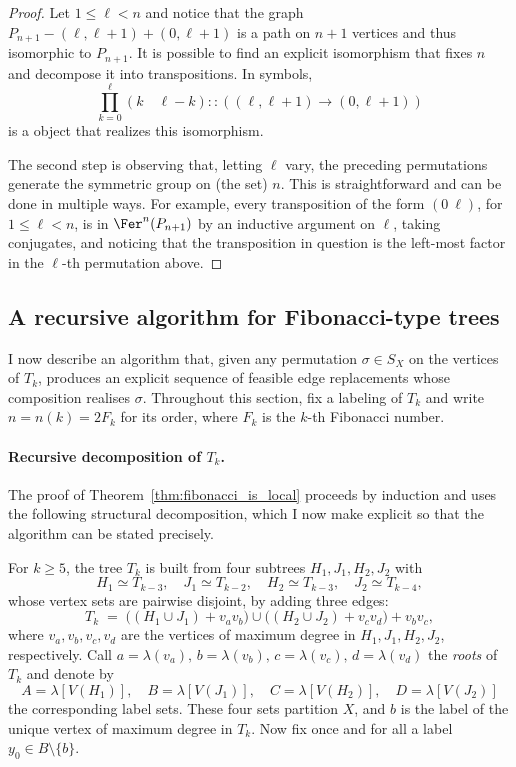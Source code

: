 \begin{proof}
    Let $1\leq\ell<n$ and notice that the graph $P_{n+1}-(\ell,\ell+1)+(0,\ell+1)$ is a path on $n+1$ vertices and thus isomorphic to $P_{n+1}$.
    It is possible to find an explicit isomorphism that fixes $n$ and decompose it into transpositions.
    In symbols, $$\prod_{k=0}^\ell(k\quad\ell-k)::((\ell,\ell+1)\to(0,\ell+1))$$ is a \tfer object that realizes this isomorphism.
    
    The second step is observing that, letting $\ell$ vary, the preceding permutations generate the symmetric group on (the set) $n$.
    This is straightforward and can be done in multiple ways.
    For example, every transposition of the form $(0\ \ell)$, for $1\leq\ell<n$, is in $\Fer^n(P_{n+1})$ by an inductive argument on $\ell$, taking conjugates, and noticing that the transposition in question is the left-most factor in the $\ell$-th permutation above.
\end{proof}

\subsection{A recursive algorithm for Fibonacci-type trees}\label{subsec:algorithm_Tk}

I now describe an algorithm that, given any permutation $\sigma\in S_X$ on the vertices of $T_k$, produces an explicit sequence of feasible edge replacements whose composition realises $\sigma$.
Throughout this section, fix a labeling of $T_k$ and write $n = n(k) = 2F_k$ for its order, where $F_k$ is the $k$-th Fibonacci number.

\paragraph{Recursive decomposition of $T_k$.}
The proof of Theorem~\ref{thm:fibonacci_is_local} proceeds by induction and uses the following structural decomposition, which I now make explicit so that the algorithm can be stated precisely.

For $k \ge 5$, the tree $T_k$ is built from four subtrees $H_1, J_1, H_2, J_2$ with
$$
    H_1 \simeq T_{k-3},\quad
    J_1 \simeq T_{k-2},\quad
    H_2 \simeq T_{k-3},\quad
    J_2 \simeq T_{k-4},
$$
whose vertex sets are pairwise disjoint, by adding three edges:
$$
    T_k
    \;=\;
    \bigl((H_1 \cup J_1) + v_a v_b\bigr)
    \cup
    \bigl((H_2 \cup J_2) + v_c v_d\bigr)
    + v_b v_c,
$$
where $v_a, v_b, v_c, v_d$ are the vertices of maximum degree in $H_1, J_1, H_2, J_2$, respectively.
Call $a = \lambda(v_a),\, b = \lambda(v_b),\, c = \lambda(v_c),\,d = \lambda(v_d)$ the \emph{roots} of $T_k$ and denote by
$$
    A = \lambda[V(H_1)],\quad
    B = \lambda[V(J_1)],\quad
    C = \lambda[V(H_2)],\quad
    D = \lambda[V(J_2)]
$$
the corresponding label sets.
These four sets partition $X$, and $b$ is the label of the unique vertex of maximum degree in $T_k$.
Now fix once and for all a label $y_0 \in B \setminus \{b\}$.

